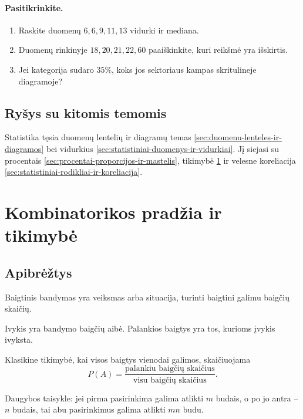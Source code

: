 \paragraph{Pasitikrinkite.}
\begin{enumerate}[label=\alph*)]
\item Raskite duomenų $6,6,9,11,13$ vidurki ir mediana.
\item Duomenų rinkinyje $18,20,21,22,60$ paaiškinkite, kuri reikšmė yra išskirtis.
\item Jei kategorija sudaro $35\%$, koks jos sektoriaus kampas skritulineje diagramoje?
\end{enumerate}

\subsection{Ryšys su kitomis temomis}
Statistika tęsia duomenų lentelių ir diagramų temas \ref{sec:duomenu-lenteles-ir-diagramos} bei vidurkius \ref{sec:statistiniai-duomenys-ir-vidurkiai}. Jį siejasi su procentais \ref{sec:procentai-proporcijos-ir-mastelis}, tikimybė \ref{sec:kombinatorikos-pradzia-ir-tikimybe} ir velesne koreliacija \ref{sec:statistiniai-rodikliai-ir-koreliacija}.

\section{Kombinatorikos pradžia ir tikimybė}\label{sec:kombinatorikos-pradzia-ir-tikimybe}

\subsection{Apibrėžtys}
\begin{apibreztis}
Baigtinis bandymas yra veiksmas arba situacija, turinti baigtini galimu baigčių skaičių.
\end{apibreztis}
\begin{apibreztis}
Ivykis yra bandymo baigčių aibė. Palankios baigtys yra tos, kurioms įvykis ivyksta.
\end{apibreztis}
\begin{apibreztis}
Klasikine tikimybė, kai visos baigtys vienodai galimos, skaičiuojama
\[
P(A)=\frac{\text{palankiu baigčių skaičius}}{\text{visu baigčių skaičius}}.
\]
\end{apibreztis}
\begin{apibreztis}
Daugybos taisykle: jei pirma pasirinkima galima atlikti $m$ budais, o po jo antra -- $n$ budais, tai abu pasirinkimus galima atlikti $mn$ budu.
\end{apibreztis}

